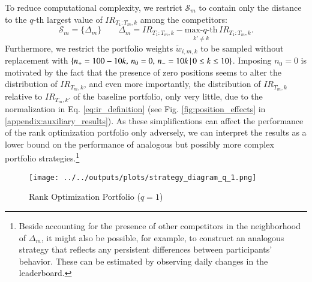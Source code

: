 \documentclass[3p,times,twocolumn]{elsarticle}
\newcommand{\splitatcommas}[1]{%
  \begingroup
  \begingroup\lccode`~=`, \lowercase{\endgroup
    \edef~{\mathchar\the\mathcode`, \penalty0 \noexpand\hspace{0pt plus 1em}}%
  }\mathcode`,="8000 #1%
  \endgroup
}
\begin{document}
To reduce computational complexity, we restrict $\mathcal{S}_{m}$ to contain only the distance to the $q$-th largest value of $IR_{T_{1}:T_{m},k}$ among the competitors:
\begin{equation}
    \mathcal{S}_m = \lbrace \Delta_{m} \rbrace \qquad \Delta_{m} = IR_{T_1:T_m,k} - \underset{k' \neq k}{\textrm{max-$q$-th}} \,IR_{T_1:T_m,k}.
\end{equation}
Furthermore, we restrict the portfolio weights $\tilde{w}_{i,m,k}$ to be sampled without replacement with $\splitatcommas{\{n_{+}=100-10k,\,n_{0}=0,\,n_{-}=10k\,|\,0\leq k \leq 10\}}$.
Imposing $n_{0}=0$ is motivated by the fact that the presence of zero positions seems to alter the distribution of $IR_{T_{m},k}$, and even more importantly, the distribution of $IR_{T_{m},k}$ relative to $IR_{T_{m},k'}$ of the baseline portfolio, only very little, due to the normalization in Eq. \ref{eq:ir_definition} (see Fig. \ref{fig:position_effects} in \ref{appendix:auxiliary_results}).
As these simplifications can affect the performance of the rank optimization portfolio only adversely, we can interpret the results as a lower bound on the performance of analogous but possibly more complex portfolio strategies.\footnote{
    Beside accounting for the presence of other competitors in the neighborhood of $\Delta_{m}$, it might also be possible, for example, to construct an analogous strategy that reflects any persistent differences between participants' behavior.
    These can be estimated by observing daily changes in the leaderboard.
}

\begin{figure}
    \centering
    \texttt{[image: ../../outputs/plots/strategy\_diagram\_q\_1.png]}
    \caption{Rank Optimization Portfolio ($q=1$)\\
        \footnotesize
    }
    \label{fig:strategy_diagram_q_1}
\end{figure}
\end{document}
